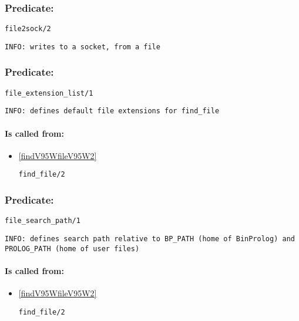 \subsubsection{Predicate:} \label{file2sockV95W2}

\begin{verbatim}
file2sock/2
\end{verbatim}

{\small \begin{verbatim}
INFO: writes to a socket, from a file

\end{verbatim}}

\subsubsection{Predicate:} \label{fileV95WextensionV95WlistV95W1}

\begin{verbatim}
file_extension_list/1
\end{verbatim}

{\small \begin{verbatim}
INFO: defines default file extensions for find_file

\end{verbatim}}
\paragraph{Is called from:} 
\begin{itemize}
\item \ref{findV95WfileV95W2} 
\begin{verbatim}
find_file/2
\end{verbatim}

\end{itemize}

\subsubsection{Predicate:} \label{fileV95WsearchV95WpathV95W1}

\begin{verbatim}
file_search_path/1
\end{verbatim}

{\small \begin{verbatim}
INFO: defines search path relative to BP_PATH (home of BinProlog) and PROLOG_PATH (home of user files)

\end{verbatim}}
\paragraph{Is called from:} 
\begin{itemize}
\item \ref{findV95WfileV95W2} 
\begin{verbatim}
find_file/2
\end{verbatim}

\end{itemize}

